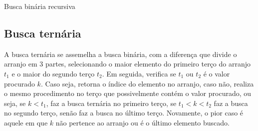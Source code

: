 \begin{algorithm}[H]
  \DontPrintSemicolon
  \SetAlgoLined
  \caption{Busca binária recursiva}

  \BlankLine
  
\end{algorithm}



\subsection{Busca ternária}

A busca ternária se assemelha a busca binária, com a diferença que divide o arranjo em 3 partes, selecionando o maior elemento do primeiro terço do arranjo $t_1$ e o maior do segundo terço $t_2$. Em seguida, verifica se $t_1$ ou $t_2$ é o valor procurado $k$. Caso seja, retorna o índice do elemento no arranjo, caso não, realiza o mesmo procedimento no terço que possivelmente contém o valor procurado, ou seja, se $k<t_1$, faz a busca ternária no primeiro terço, se $t_1<k<t_2$ faz a busca no segundo terço, senão faz a busca no último terço. Novamente, o pior caso é aquele em que $k$ não pertence ao arranjo ou é o último elemento buscado.

